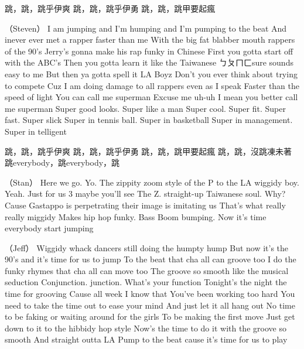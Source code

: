\documentclass[UTF8,a4paper,oneside,twocolumn,12pt]{ctexbook}
\newenvironment{lyric}{
	}
{}
\begin{document}
\begin{lyric}
	跳，跳，跳乎伊爽
	跳，跳，跳乎伊勇
	跳，跳，跳甲要起瘋

	（Steven）
	I am jumping and I'm humping and I'm pumping to the beat
	And inever ever met a rapper faster than me
	With the big fat blabber mouth rappers of the 90's
	Jerry's gonna make his rap funky in Chinese
	First you gotta start off with the ABC's
	Then you gotta learn it like the Taiwanese
	ㄅㄆㄇㄈsure sounds easy to me
	But then ya gotta spell it LA Boyz
	Don't you ever think about trying to compete
	Cuz I am doing damage to all rappers even as I speak
	Faster than the speed of light
	You can call me superman
	Excuse me uh-uh I mean you better call me superman
	Super good looks. Super like a man
	Super cool. Super fit. Super fast. Super slick
	Super in tennis ball. Super in basketball
	Super in management. Super in telligent

	跳，跳，跳乎伊爽
	跳，跳，跳乎伊勇
	跳，跳，跳甲要起瘋
	跳，跳，沒跳凍未著
	跳everybody，跳everybody，跳

	（Stan）
	Here we go. Yo. The zippity zoom style of the P to the
	LA wiggidy boy. Yeah. Just for us 3 maybe you'll see
	The Z. straight-up Taiwanese soul. Why? Cause
	Gastappo is perpetrating their image is imitating us
	That's what really really miggidy
	Makes hip hop funky. Bass
	Boom bumping. Now it's time everybody start jumping

	（Jeff）
	Wiggidy whack dancers still doing the humpty hump
	But now it's the 90's and it's time for us to jump
	To the beat that cha all can groove too
	I do the funky rhymes that cha all can move too
	The groove so smooth like the musical seduction
	Conjunction. junction. What's your function
	Tonight's the night the time for grooving
	Cause all week I know that
	You've been working too hard
	You need to take the time out to ease your mind
	And just let it all hang out
	No time to be faking or waiting around for the girls
	To be making the first move
	Just get down to it to the hibbidy hop style
	Now's the time to do it with the groove so smooth
	And straight outta LA
	Pump to the beat cause it's time for us to play
\end{lyric}
\end{document}
